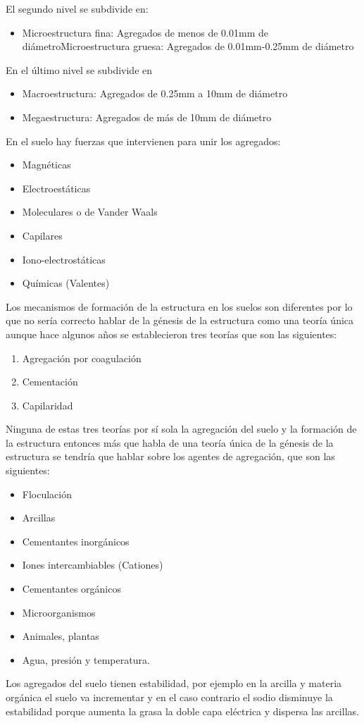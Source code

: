     El segundo nivel se subdivide en: \begin{itemize}
        \item Microestructura fina: Agregados de menos de 0.01mm de diámetroMicroestructura gruesa: Agregados de 0.01mm-0.25mm de diámetro
    \end{itemize}
    En el último nivel se subdivide en \begin{itemize}
        \item Macroestructura: Agregados de 0.25mm a 10mm de diámetro
        \item Megaestructura: Agregados de más de 10mm de diámetro
    \end{itemize}
    En el suelo hay fuerzas que intervienen para unir los agregados:
    \begin{itemize}
        \item Magnéticas
        \item Electroestáticas
        \item Moleculares o de Vander Waals
        \item Capilares
        \item Iono-electrostáticas
        \item Químicas (Valentes)
    \end{itemize}
    Los mecanismos de formación de la estructura en los suelos son diferentes por lo que no sería correcto hablar de la génesis de la estructura como una teoría única aunque hace algunos años se establecieron tres teorías que son las siguientes:
    \begin{enumerate}
        \item Agregación por coagulación
        \item Cementación
        \item Capilaridad
    \end{enumerate}
    Ninguna de estas tres teorías por sí sola la agregación del suelo y la formación de la estructura entonces más que habla de una teoría única de la génesis de la estructura se tendría que hablar sobre los agentes de agregación, que son las siguientes:
    \begin{itemize}
        \item Floculación
        \item Arcillas
        \item Cementantes inorgánicos
        \item Iones intercambiables (Cationes)
        \item Cementantes orgánicos
        \item Microorganismos
        \item Animales, plantas
        \item Agua, presión y temperatura.
    \end{itemize}
    Los agregados del suelo tienen estabilidad, por ejemplo en la arcilla y materia orgánica el suelo va incrementar y en el caso contrario el sodio disminuye la estabilidad porque aumenta la grasa la doble capa eléctrica y dispersa las arcillas.
    
